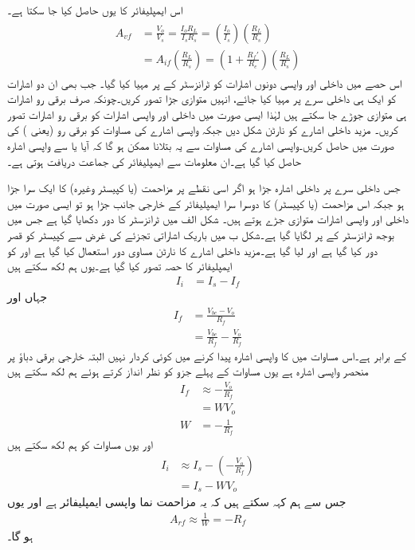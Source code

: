 اس ایمپلیفائر کا  یوں حاصل کیا جا سکتا ہے۔
\begin{gather}
\begin{aligned}
A_{vf}&=\frac{V_o}{V_s}=\frac{I_o R_L}{I_s R_s}=\left (\frac{I_o}{I_s} \right) \left (\frac{R_L}{R_s} \right) \\
&=A_{if} \left(\frac{R_L}{R_s} \right)=\left( 1+\frac{R_f'}{R_e}\right) \left(\frac{R_L}{R_s} \right)
\end{aligned}
\end{gather}
%
اس حصے میں  داخلی اور واپسی دونوں اشارات کو ٹرانزسٹر کے  پر مہیا کیا گیا۔ جب بھی ان  دو اشارات کو ایک ہی داخلی سرے پر مہیا کیا جائے، انہیں متوازی جڑا تصور کریں۔چونکہ صرف برقی رو اشارات ہی متوازی جوڑے جا سکتے ہیں لہٰذا ایسی صورت میں داخلی اور واپسی اشارات کو برقی رو اشارات تصور کریں۔ مزید داخلی اشارے کو نارٹن شکل دیں جبکہ واپسی اشارے کی مساوات کو برقی رو (یعنی ) کی صورت میں حاصل کریں۔واپسی اشارے کی مساوات سے یہ بتلانا ممکن ہو گا کہ آیا  یا  سے واپسی اشارہ حاصل کیا گیا ہے۔ان معلومات سے ایمپلیفائر کی جماعت دریافت ہوتی ہے۔ 

 جس داخلی سرے پر داخلی اشارہ جڑا ہو اگر اسی نقطے پر مزاحمت (یا کپیسٹر وغیرہ) کا ایک سرا جڑا ہو جبکہ اس مزاحمت (یا کپیسٹر) کا دوسرا سرا ایمپلیفائر کے خارجی جانب جڑا ہو تو ایسی صورت میں داخلی اور واپسی اشارات متوازی جڑے ہوتے ہیں۔
شکل  الف میں ٹرانزسٹر کا دور دکھایا گیا ہے جس میں بوجھ  ٹرانزسٹر کے  پر لگایا گیا ہے۔شکل  ب میں باریک اشاراتی تجزئے کی غرض سے کپیسٹر کو قصر دور کیا گیا ہے اور   لیا گیا ہے۔مزید داخلی اشارے کا نارٹن مساوی دور استعمال کیا گیا ہے اور  کو ایمپلیفائر کا حصہ تصور کیا گیا ہے۔یوں ہم لکھ سکتے ہیں
\begin{align} \label{مساوات_واپسی_مزاحمت_نما_واپسی_رو_اشارہ}
I_i&=I_s-I_f
\end{align}
جہاں  اور
\begin{align*}
I_f&=\frac{V_{be}-V_o}{R_f} \\
&=\frac{V_{be}}{R_f}-\frac{V_o}{R_f}
\end{align*}
کے برابر ہے۔اس مساوات میں  کا واپسی اشارہ پیدا کرنے میں کوئی کردار نہیں البتہ  خارجی برقی دباؤ پر منحصر واپسی اشارہ ہے یوں مساوات کے پہلے جزو کو نظر انداز کرتے ہوئے ہم لکھ سکتے ہیں
\begin{align*}
I_f & \approx -\frac{V_o}{R_f} \\
&=W V_o \\
W&=-\frac{1}{R_f}
\end{align*}
اور یوں مساوات  کو ہم لکھ سکتے ہیں
\begin{align*}
I_i &\approx I_s-\left(-\frac{V_o}{R_f} \right) \\
&=I_s-W V_o
\end{align*}
جس سے ہم کہہ سکتے ہیں کہ یہ مزاحمت نما واپسی ایمپلیفائر ہے اور یوں
\begin{align}
A_{rf} \approx \frac{1}{W}=-R_f
\end{align}
ہو گا۔

